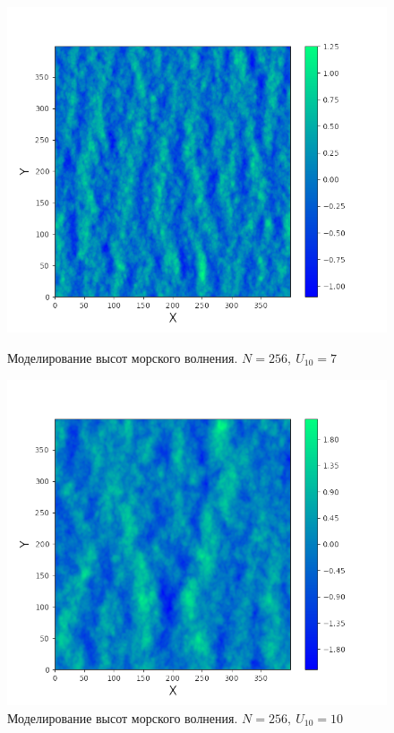\begin{figure}[H]
\vfill
\begin{minipage}[h]{0.45\linewidth}
	\centering
	\includegraphics[width=\linewidth]{img/water7.png}
	\caption{Моделирование высот морского волнения. $N=256, ~ U_{10}=7$  }
	\label{fig:water7}
\end{minipage}
\hfill
\begin{minipage}[h]{0.45\linewidth}
	\centering
	\includegraphics[width=\linewidth]{img/water10.png}
	\caption{Моделирование высот морского волнения. $N=256, ~ U_{10}=10$ }
	\label{fig:water10}
\end{minipage}
\end{figure}

